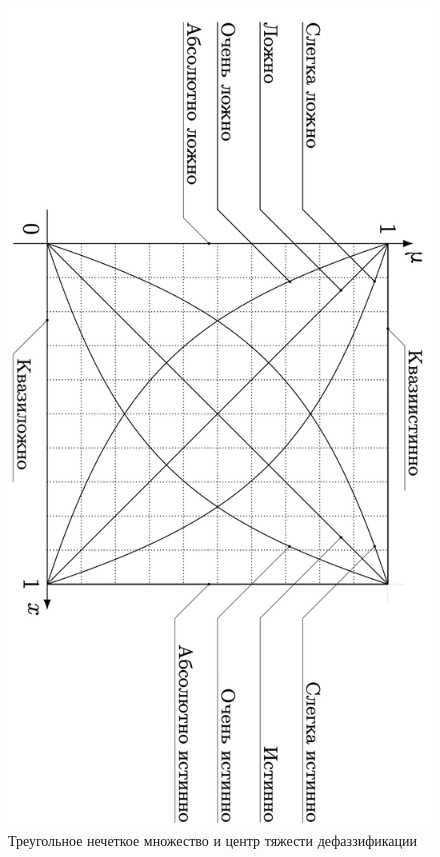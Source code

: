 \begin{figure}[H]
  \centering
  \includegraphics[width=\textwidth]{images/нечеткая истинность.png}
  \caption{Треугольное нечеткое множество и центр тяжести дефаззификации \cite{Kulabukhov2023}}
  \label{fig:centroid_defuzz}
\end{figure}


